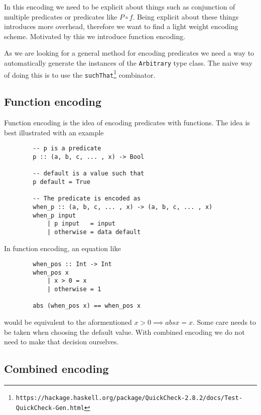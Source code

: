         In this encoding we need to be explicit about things such as conjunction
        of multiple predicates or predicates like $P\circ f$.
        Being explicit about these things introduces more overhead, therefore
        we want to find a light weight encoding scheme. Motivated by this
        we introduce function encoding.

        As we are looking for a general method for encoding predicates we need
        a way to automatically generate the instances of the \texttt{Arbitrary} type class.
        The naive way of doing this is to use the
        \texttt{suchThat}\footnote{\texttt{https://hackage.haskell.org/package/QuickCheck-2.8.2/docs/Test-QuickCheck-Gen.html}} 
        combinator. 

    \subsection{Function encoding}

        Function encoding is the idea of encoding 
        predicates with functions. The idea is best
        illustrated with an example
        \begin{verbatim}
        -- p is a predicate
        p :: (a, b, c, ... , x) -> Bool

        -- default is a value such that
        p default = True

        -- The predicate is encoded as
        when_p :: (a, b, c, ... , x) -> (a, b, c, ... , x)
        when_p input
            | p input   = input
            | otherwise = data default
        \end{verbatim}
        In function encoding, an equation like
        \begin{verbatim}
        when_pos :: Int -> Int
        when_pos x
            | x > 0 = x
            | otherwise = 1

        abs (when_pos x) == when_pos x

        \end{verbatim}
        would be equivalent to the aformentioned $x > 0 \implies abs x = x$.
        Some care needs to be taken when choosing the default value.
        With combined encoding we do not need to make that decision ourselves.

     \subsection{Combined encoding}\label{combined_encoding}
        
